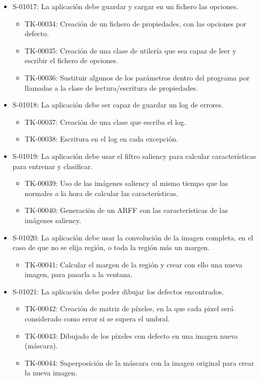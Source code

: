 \begin{itemize}
 \item S-01017: La aplicación debe guardar y cargar en un fichero las opciones.
  \begin{itemize}
   \item TK-00034: Creación de un fichero de propiedades, con las opciones por defecto.
   \item TK-00035: Creación de una clase de utilería que sea capaz de leer y escribir el fichero de opciones.
   \item TK-00036: Sustituir algunos de los parámetros dentro del programa por llamadas a la clase de lectura/escritura de propiedades.
  \end{itemize}
 \item S-01018: La aplicación debe ser capaz de guardar un log de errores.
  \begin{itemize}
   \item TK-00037: Creación de una clase que escriba el log.
   \item TK-00038: Escritura en el log en cada excepción.
  \end{itemize}
 \item S-01019: La aplicación debe usar el filtro saliency para calcular características para entrenar y clasificar.
  \begin{itemize}
   \item TK-00039: Uso de las imágenes saliency al mismo tiempo que las normales a la hora de calcular las características.
   \item TK-00040: Generación de un ARFF con las características de las imágenes saliency.
  \end{itemize}
 \item S-01020: La aplicación debe usar la convolución de la imagen completa, en el caso de que no se elija región, o toda la región más un margen.
  \begin{itemize}
   \item TK-00041: Calcular el margen de la región y crear con ello una nueva imagen, para pasarla a la ventana.
  \end{itemize}
 \item S-01021: La aplicación debe poder dibujar los defectos encontrados.
  \begin{itemize}
   \item TK-00042: Creación de matriz de píxeles, en la que cada pixel será considerado como error si se supera el umbral.
   \item TK-00043: Dibujado de los píxeles con defecto en una imagen nueva (máscara).
   \item TK-00044: Superposición de la máscara con la imagen original para crear la nueva imagen.

\end{itemize}
\end{itemize}
